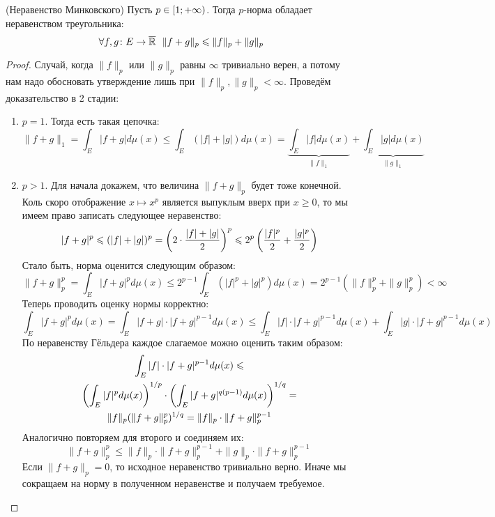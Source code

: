 \begin{theorem} (Неравенство Минковского)
	Пусть $p \in \left[1; +\infty\right)$. Тогда $p$-норма обладает неравенством треугольника:
	\[
		\forall f, g \colon E \to \overline{\mathbb{R}}\ \ \|f + g\|_p \leqslant \|f\|_p + \|g\|_p
	\]
\end{theorem}

\begin{proof}
	Случай, когда $\|f\|_p$ или $\|g\|_p$ равны $\infty$ тривиально верен, а потому нам надо обосновать утверждение лишь при $\|f\|_p, \|g\|_p < \infty$. Проведём доказательство в 2 стадии:
	\begin{enumerate}
		\item $p = 1$. Тогда есть такая цепочка:
		\[
			\|f + g\|_1 = \int_E |f + g|d\mu(x) \le \int_E (|f| + |g|)d\mu(x) = \underbrace{\int_E |f|d\mu(x)}_{\|f\|_1} + \underbrace{\int_E |g|d\mu(x)}_{\|g\|_1}
		\]
		
		\item $p > 1$. Для начала докажем, что величина $\|f + g\|_p$ будет тоже конечной. Коль скоро отображение $x \mapsto x^p$ является выпуклым вверх при $x \ge 0$, то мы имеем право записать следующее неравенство:
		\[
			|f + g|^p \leqslant (|f| + |g|)^p  = \left(2 \cdot \frac{|f| + |g|}{2}\right)^p \leqslant 2^p \left(\frac{|f|^p}{2} + \frac{|g|^p}{2}\right)
		\]
		Стало быть, норма оценится следующим образом:
		\[
			\|f + g\|_p^p = \int_E |f + g|^pd\mu(x) \le 2^{p - 1} \int_E (|f|^p + |g|^p)d\mu(x) = 2^{p - 1}(\|f\|_p^p + \|g\|_p^p) < \infty
		\]
		Теперь проводить оценку нормы корректно:
		\[
			\int_E |f + g|^pd\mu(x) = \int_E |f + g| \cdot |f + g|^{p - 1}d\mu(x) \le \int_E |f| \cdot |f + g|^{p - 1}d\mu(x) + \int_E |g| \cdot |f + g|^{p - 1}d\mu(x)
		\]
		По неравенству Гёльдера каждое слагаемое можно оценить таким образом:
		\begin{multline*}
			\int_E |f| \cdot |f + g|^{p - 1}d\mu(x) \leqslant 
			\\
			\left(\int_E |f|^pd\mu(x)\right)^{1 / p} \cdot \left(\int_E |f + g|^{q(p - 1)}d\mu(x)\right)^{1 / q} =
			\\
			\|f\|_p (\|f + g\|_p^p)^{1 / q} = \|f\|_p \cdot \|f + g\|_p^{p - 1}
		\end{multline*}
		Аналогично повторяем для второго и соединяем их:
		\[
			\|f + g\|_p^p \le \|f\|_p \cdot \|f + g\|_p^{p - 1} + \|g\|_p \cdot \|f + g\|_p^{p - 1}
		\]
		Если $\|f + g\|_p = 0$, то исходное неравенство тривиально верно. Иначе мы сокращаем на норму в полученном неравенстве и получаем требуемое.
	\end{enumerate}
\end{proof}

